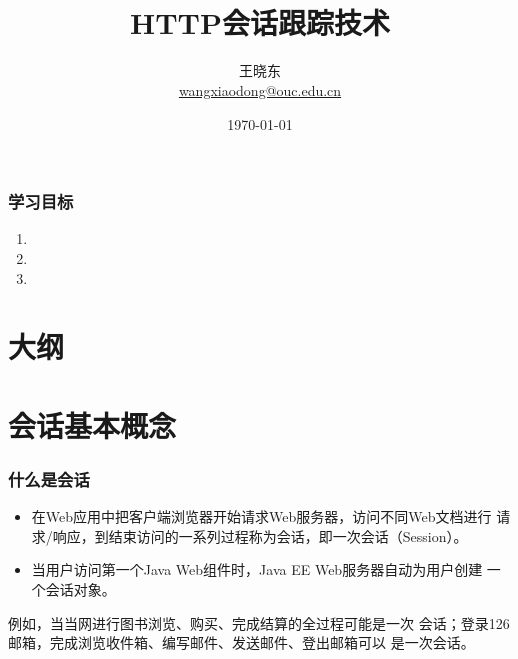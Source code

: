 
\title[KevinW@OUC]{\\  
HTTP会话跟踪技术}
\author[王晓东]{王晓东\\
  \href{mailto:wangxiaodong@ouc.edu.cn}{\footnotesize wangxiaodong@ouc.edu.cn}}
\date{\today}


\frame{\titlepage}
\begin{frame}
  \frametitle{学习目标}

  \begin{enumerate}
  \item 
  \item 
  \item 
  \end{enumerate}  
\end{frame} 
\section*{大纲}

\section{会话基本概念}

\begin{frame}
  \frametitle{什么是会话} 

  \begin{itemize}
  \item 在Web应用中把客户端浏览器开始请求Web服务器，访问不同Web文档进行
    请求/响应，到结束访问的一系列过程称为会话，即一次会话（Session）。
  \item 当用户访问第一个Java Web组件时，Java EE Web服务器自动为用户创建
    一个会话对象。
  \end{itemize}

  {\Blue\kai 例如，当当网进行图书浏览、购买、完成结算的全过程可能是一次
    会话；登录126邮箱，完成浏览收件箱、编写邮件、发送邮件、登出邮箱可以
    是一次会话。}
\end{frame}

